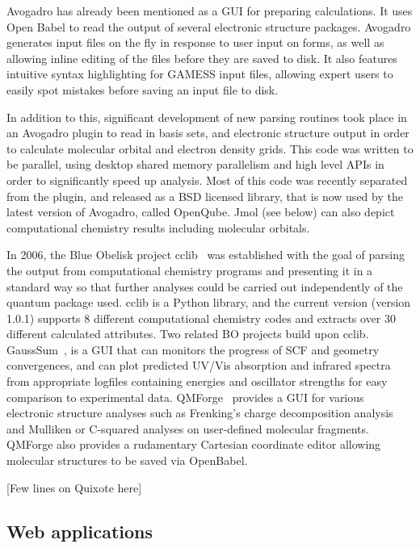 \documentclass[10pt]{bmc_article}
\newenvironment{bmcformat}{\fussy\setboolean{publ}{true}}{\fussy}
\begin{document}
\begin{bmcformat}
Avogadro has already been mentioned as a GUI for preparing calculations.
It uses Open Babel to read the output of several electronic structure
packages. Avogadro generates input files on the fly in response to user
input on forms, as well as allowing inline editing of the files before
they are saved to disk. It also features intuitive syntax highlighting
for GAMESS input files, allowing expert users to easily spot mistakes
before saving an input file to disk.

In addition to this, significant development of new parsing routines took
place in an Avogadro plugin to read in basis sets, and electronic structure
output in order to calculate molecular orbital and electron density grids.
This code was written to be parallel, using desktop shared memory parallelism
and high level APIs in order to significantly speed up analysis. Most of this
code was recently separated from the plugin, and released as a BSD licensed
library, that is now used by the latest version of Avogadro, called OpenQube.
Jmol (see below)
can also depict computational chemistry results including molecular orbitals.

In 2006, the Blue Obelisk project cclib~\cite{cclib} was established
with the goal of parsing the output from computational chemistry
programs and presenting it in a standard way so that further analyses
could be carried out independently of the quantum package used.
cclib is a Python library, and the current version (version 1.0.1)
supports 8 different computational chemistry codes and extracts over
30 different calculated attributes. Two related BO projects build upon 
cclib. GaussSum~\cite{WebGaussSum},
is a GUI that can monitors the progress of SCF and geometry convergences, 
and can plot predicted UV/Vis absorption and infrared spectra from 
appropriate logfiles containing energies and oscillator strengths for easy 
comparison to experimental data. QMForge~\cite{WebQMForge} provides 
a GUI for various electronic structure analyses such as Frenking's charge 
decomposition analysis~\cite{Frenking} and Mulliken or C-squared analyses
on user-defined molecular fragments. QMForge also provides a rudamentary
Cartesian coordinate editor allowing molecular structures to be saved via OpenBabel.

[Few lines on Quixote here]

\subsection*{Web applications}


\end{bmcformat}
\end{document}
